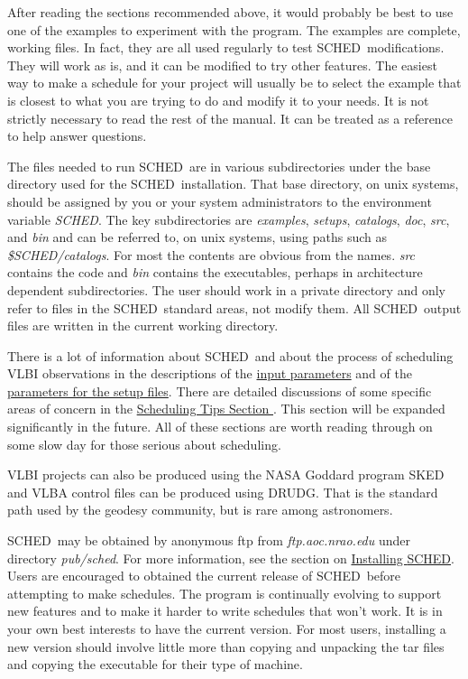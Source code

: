\documentclass{report}
\newcommand{\sched}{{\sc SCHED}}
\newcommand{\schedb}{{\sc SCHED~}}
\begin{document}
After reading the sections recommended above, it would probably be
best to use one of the examples to experiment with the program.  The
examples are complete, working files.  In fact, they are all used
regularly to test \schedb modifications.  They will work as is, and
it can be modified to try other features.  The easiest way to make a
schedule for your project will usually be to select the example that
is closest to what you are trying to do and modify it to your needs.
It is not strictly necessary to read the rest of the manual.  It can
be treated as a reference to help answer questions.

The files needed to run \schedb are in various subdirectories under
the base directory used for the \schedb installation.  That base
directory, on unix systems, should be assigned by you or your system
administrators to the environment variable {\sl SCHED}.  The key
subdirectories are {\sl examples}, {\sl setups}, {\sl catalogs}, {\sl
doc}, {\sl src}, and {\sl bin} and can be referred to, on unix systems,
using paths such as {\sl \$SCHED/catalogs}.  For most the contents are
obvious from the names.  {\sl src} contains the code and {\sl bin}
contains the executables, perhaps in architecture dependent
subdirectories.  The user should work in a private directory and only
refer to files in the \schedb standard areas, not modify them.  All
\schedb output files are written in the current working directory.

There is a lot of information about \schedb and about the process of
scheduling VLBI observations in the descriptions of the
\hyperref[SEC:SCHPAR]{input parameters}
and of the
\hyperref[SSEC:SETLST]{parameters for the setup files}.
There are detailed discussions of
some specific areas of concern in the
\hyperref[SEC:TIPS]{Scheduling Tips Section }.
This section will be expanded significantly in the future.  All of these
sections are worth reading through on some slow day for those serious
about scheduling.

VLBI projects can also be produced using the NASA Goddard program {\sc
SKED} and VLBA control files can be produced using {\sc DRUDG}.  That
is the standard path used by the geodesy community, but is rare among
astronomers.

\schedb may be obtained by anonymous ftp from {\sl ftp.aoc.nrao.edu}
under directory {\sl pub/sched}.  For more information, see the
section on
\hyperref[SEC:INSTALL]{Installing \sched}.
Users are encouraged to obtained the current release
of \schedb before attempting to make schedules.  The program is
continually evolving to support new features and to make it harder
to write schedules that won't work.  It is in your own best interests
to have the current version.  For most users, installing a new
version should involve little more than copying and unpacking the tar
files and copying the executable for their type of machine.
\end{document}
